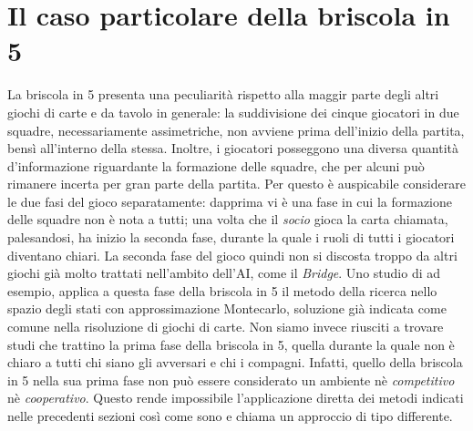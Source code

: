\section{Il caso particolare della briscola in 5}

La briscola in 5 presenta una peculiarità rispetto alla maggir parte degli altri giochi di carte e da tavolo in generale: la suddivisione dei cinque giocatori in due squadre, necessariamente assimetriche, non avviene prima dell'inizio della partita, bensì all'interno della stessa.
Inoltre, i giocatori posseggono una diversa quantità d'informazione riguardante la formazione delle squadre, che per alcuni può rimanere incerta per gran parte della partita.
Per questo è auspicabile considerare le due fasi del gioco separatamente: dapprima vi è una fase in cui la formazione delle squadre non è nota a tutti; una volta che il \emph{socio} gioca la carta chiamata, palesandosi, ha inizio la seconda fase, durante la quale i ruoli di tutti i giocatori diventano chiari.
La seconda fase del gioco quindi non si discosta troppo da altri giochi già molto trattati nell'ambito dell'AI, come il \emph{Bridge}.
Uno studio di \cite{villa} ad esempio, applica a questa fase della briscola in 5 il metodo della ricerca nello spazio degli stati con approssimazione Montecarlo, soluzione già indicata come comune nella risoluzione di giochi di carte.
Non siamo invece riusciti a trovare studi che trattino la prima fase della briscola in 5, quella durante la quale non è chiaro a tutti chi siano gli avversari e chi i compagni.
Infatti, quello della briscola in 5 nella sua prima fase non può essere considerato un ambiente nè \emph{competitivo} nè \emph{cooperativo}.
Questo rende impossibile l'applicazione diretta dei metodi indicati nelle precedenti sezioni così come sono e chiama un approccio di tipo differente.

